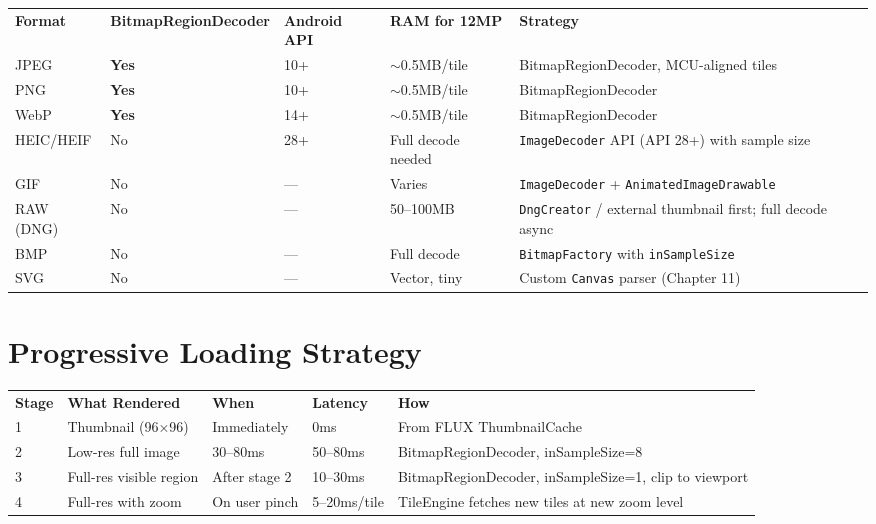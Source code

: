 \documentclass[12pt,a4paper]{report}
\newcommand{\ra}[1]{\renewcommand{\arraystretch}{#1}}
\newcommand{\TH}[1]{\rowcolor{P1}\color{white}\bfseries #1}
\begin{document}
\begin{center}\ra{1.35}
\begin{tabular}{L{2.4cm} C{1.8cm} C{2.0cm} C{2.4cm} L{5.2cm}}
\TH{Format} & \TH{BitmapRegionDecoder} & \TH{Android API} & \TH{RAM for 12MP} & \TH{Strategy} \\
 JPEG & \textbf{Yes} & 10+ & $\sim$0.5MB/tile & BitmapRegionDecoder, MCU-aligned tiles \\
 PNG & \textbf{Yes} & 10+ & $\sim$0.5MB/tile & BitmapRegionDecoder \\
 WebP & \textbf{Yes} & 14+ & $\sim$0.5MB/tile & BitmapRegionDecoder \\
 HEIC/HEIF & No & 28+ & Full decode needed & \texttt{ImageDecoder} API (API 28+) with sample size \\
 GIF & No & — & Varies & \texttt{ImageDecoder} + \texttt{AnimatedImageDrawable} \\
 RAW (DNG) & No & — & 50--100MB & \texttt{DngCreator} / external thumbnail first; full decode async \\
 BMP & No & — & Full decode & \texttt{BitmapFactory} with \texttt{inSampleSize} \\
 SVG & No & — & Vector, tiny & Custom \texttt{Canvas} parser (Chapter 11) \\
\end{tabular}
\end{center}

\section{Progressive Loading Strategy}

\begin{center}\ra{1.3}
\begin{tabular}{C{0.8cm} L{2.4cm} L{2.4cm} C{2.0cm} L{5.8cm}}
\TH{Stage} & \TH{What Rendered} & \TH{When} & \TH{Latency} & \TH{How} \\
 1 & Thumbnail (96×96) & Immediately & 0ms & From FLUX ThumbnailCache \\
 2 & Low-res full image & 30--80ms & 50--80ms & BitmapRegionDecoder, inSampleSize=8 \\
 3 & Full-res visible region & After stage 2 & 10--30ms & BitmapRegionDecoder, inSampleSize=1, clip to viewport \\
 4 & Full-res with zoom & On user pinch & 5--20ms/tile & TileEngine fetches new tiles at new zoom level \\
\end{tabular}
\end{center}
\end{document}
